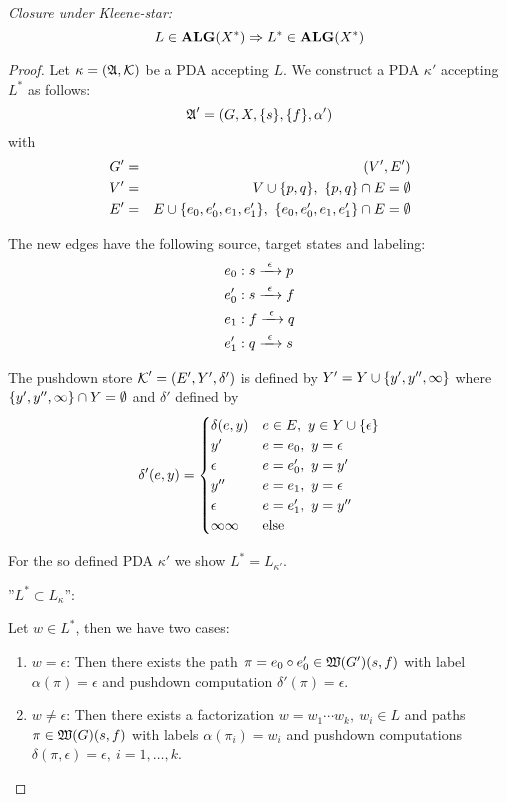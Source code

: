 {\em Closure under Kleene-star:}
\[ L \in \mbox{{\bf ALG}}(X^*) \Rightarrow L^* \in \mbox{{\bf ALG}}(X^*) \]
\begin{proof}
Let $\kappa = (\mbox{$\mathfrak{A}$}, \mbox{$\mathcal{K}$})$ be a PDA accepting $L$. We construct a PDA
$\kappa'$ accepting $L^*$ as follows:
\[ \mbox{$\mathfrak{A}$}' = (G, X, \mbox{$\{s\}$}, \mbox{$\{f\}$}, \alpha')\]
with
\begin{eqnarray*}
G' &=& (V', E') \\
V' &=& V \cup \mbox{$\{p, q\}$},\ \mbox{$\{p, q\}$} \cap E = \emptyset \\
E' &=& E \cup \mbox{$\{e_0, e_0', e_1, e_1'\}$},\ \mbox{$\{e_0, e_0', e_1, e_1'\}$} \cap E
= \emptyset \\
\end{eqnarray*}

The new edges have the following source, target states and labeling:
\begin{eqnarray*}
& e_0: s \xrightarrow{\ {\epsilon}\ } p \\
& e_0': s \xrightarrow{\ {\epsilon}\ } f \\
& e_1: f \xrightarrow{\ {\epsilon}\ } q \\
& e_1': q \xrightarrow{\ {\epsilon}\ } s \\
\end{eqnarray*}

\missingfigure

The pushdown store $\mbox{$\mathcal{K}$}' = (E', Y', \delta')$ is defined by $Y' = Y
\cup \mbox{$\{y', y'', \infty\}$}$ where $\mbox{$\{y', y'', \infty\}$} \cap Y =
\emptyset$ and $\delta'$ defined by
\[ \delta'(e, y) = \begin{cases}
\delta(e, y)		& e \in E,\ y \in  Y \cup \mbox{$\{\epsilon\}$} \\
y'							& e = e_0,\ y = \epsilon \\
\epsilon				& e = e_0',\ y = y' \\
y''							& e = e_1,\ y = \epsilon \\
\epsilon				& e = e_1',\ y = y'' \\
\infty\infty		& \text{else}
\end{cases}\]

For the so defined PDA $\kappa'$ we show $L^* = L_{\kappa'}$.

''$L^* \subset L_{\kappa}$'':

Let $w \in L^*$, then we have two cases:

\begin{enumerate}
  \item $w = \epsilon$: Then there exists the path $\pi = e_0 \circ e_0' \in
  \mbox{$\mathfrak{W}({G'})$}(s, f)$ with label $\alpha(\pi) = \epsilon$ and
  pushdown computation $\delta'(\pi) = \epsilon$.
  \item $w \neq \epsilon$: Then there exists a factorization $w = w_1 \cdots
  w_k,\ w_i \in L$ and paths $\pi \in \mbox{$\mathfrak{W}({G})$}(s, f)$ with labels
  $\alpha(\pi_i) = w_i$ and pushdown computations $\delta(\pi, \epsilon) =
  \epsilon,\ i = 1, \ldots, k$.
  

\end{enumerate}
\end{proof}
